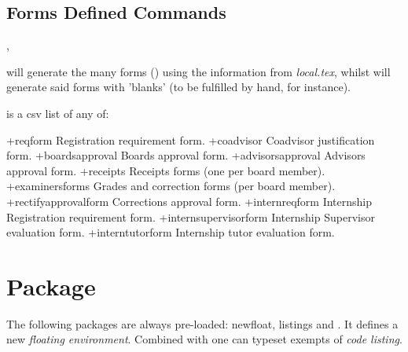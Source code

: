 \documentclass[dctools,english,tocdepth=3,secdepth=3]{ufrgscca} %
\begin{document}
\subsection{Forms Defined Commands}\label{forms.commands}
\begin{Macros}{\tcforms,\tcemptyforms}
	\begin{Syntax}%
\end{Syntax}
\Macro{\tcforms}{} will generate the many forms () using the information from \emph{local.tex}, whilst \Macro{\tcemptyforms}{} will generate said forms with 'blanks' (to be fulfilled by hand, for instance).

 is a csv list of any of:
\begin{Options+}
    \DescribeOption+{reqform} Registration requirement form.
    \DescribeOption+{coadvisor} Coadvisor justification form.
    \DescribeOption+{boardsapproval} Boards approval form.
    \DescribeOption+{advisorsapproval} Advisors approval form.
    \DescribeOption+{receipts} Receipts forms (one per board member).
    \DescribeOption+{examinersforms} Grades and correction forms (per board member).
    \DescribeOption+{rectifyapprovalform} Corrections approval  form.
    \DescribeOption+{internreqform} Internship Registration requirement form.
    \DescribeOption+{internsupervisorform} Internship Supervisor evaluation form.
    \DescribeOption+{interntutorform} Internship tutor evaluation form.
\end{Options+}

\end{Macros}


\section{ Package}
The following packages are always pre-loaded: {\MetaFmt[Pack]\sffamily newfloat, listings} and .
It defines a new \emph{floating environment}. Combined with  one can typeset exempts of \emph{code listing}.
\end{document}
